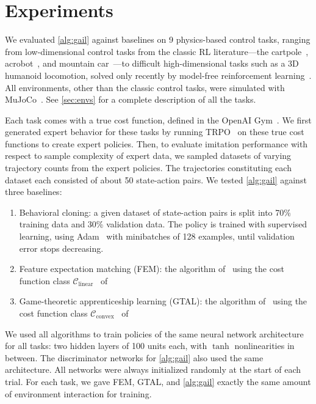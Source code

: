 \documentclass{article}
\newcommand{\1}{\mathbb{I}} %
\begin{document}
\section{Experiments} \label{sec:experiments}
We evaluated \cref{alg:gail} against baselines on 9 physics-based control tasks, ranging from  low-dimensional control tasks from the classic RL literature---the cartpole~\citep{barto1983neuronlike}, acrobot~\citep{geramifard2015rlpy}, and mountain car~\citep{moore1990efficient}---to difficult high-dimensional tasks such as a 3D humanoid locomotion, solved only recently by model-free reinforcement learning~\citep{schulman2015high,schulman2015trust}.
All environments, other than the classic control tasks, were simulated with MuJoCo~\citep{todorov2012mujoco}.
See \cref{sec:envs} for a complete description of all the tasks.

Each task comes with a true cost function, defined in the OpenAI Gym~\citep{gym}.
We first generated expert behavior for these tasks by running TRPO~\citep{schulman2015trust} on these true cost functions to create expert policies.
Then, to evaluate imitation performance with respect to sample complexity of expert data, we sampled datasets of varying trajectory counts from the expert policies.
The trajectories constituting each dataset each consisted of about 50 state-action pairs.
We tested \cref{alg:gail} against three baselines:
\begin{enumerate}
\item Behavioral cloning: a given dataset of state-action pairs is split into 70\% training data and 30\% validation data.
The policy is trained with supervised learning, using Adam~\citep{kingma2014adam} with minibatches of 128 examples, until validation error stops decreasing.
\item Feature expectation matching (FEM): the algorithm of~\citet{ho2016model} using the cost function class $\mathcal{C}_\text{linear}$~ of~\citet{abbeel2004apprenticeship}
\item Game-theoretic apprenticeship learning (GTAL): the algorithm of~\citet{ho2016model} using the cost function class $\mathcal{C}_\text{convex}$~ of~\citet{syed2007game}
\end{enumerate}
We used all algorithms to train policies of the same neural network architecture for all tasks: two hidden layers of 100 units each, with $\tanh$ nonlinearities in between.
The discriminator networks for \cref{alg:gail} also used the same architecture.
All networks were always initialized randomly at the start of each trial. For each task, we gave FEM, GTAL, and \cref{alg:gail} exactly the same amount of environment interaction for training.
\end{document}
